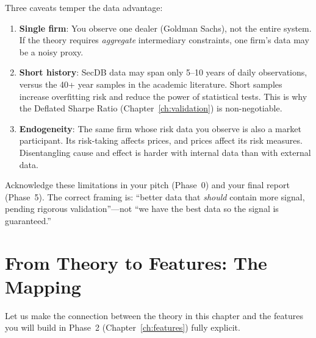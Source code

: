 \begin{warning}
Three caveats temper the data advantage:
\begin{enumerate}[nosep]
  \item \textbf{Single firm}: You observe one dealer (Goldman Sachs), not the entire system. If the theory requires \emph{aggregate} intermediary constraints, one firm's data may be a noisy proxy.
  \item \textbf{Short history}: SecDB data may span only 5--10 years of daily observations, versus the 40+ year samples in the academic literature. Short samples increase overfitting risk and reduce the power of statistical tests. This is why the Deflated Sharpe Ratio (Chapter~\ref{ch:validation}) is non-negotiable.
  \item \textbf{Endogeneity}: The same firm whose risk data you observe is also a market participant. Its risk-taking affects prices, and prices affect its risk measures. Disentangling cause and effect is harder with internal data than with external data.
\end{enumerate}
Acknowledge these limitations in your pitch (Phase~0) and your final report (Phase~5). The correct framing is: ``better data that \emph{should} contain more signal, pending rigorous validation''---not ``we have the best data so the signal is guaranteed.''
\end{warning}

\section{From Theory to Features: The Mapping}
\label{sec:theory-to-features}

Let us make the connection between the theory in this chapter and the features you will build in Phase~2 (Chapter~\ref{ch:features}) fully explicit.

